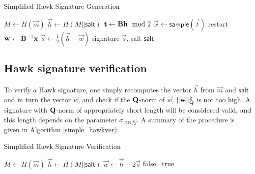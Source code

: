 \begin{algorithm}
    \caption{Simplified Hawk Signature Generation}\label{simple_hawksign}
\begin{algorithmic}[1]
    \State $M \gets H(\vec{m})$ 
    \State $\vec{h} \gets H(M || \mathsf{salt})$ 
    \State $\mathbf{t} \gets \mathbf{B} \mathbf{h} \mod 2$ 
    \State $\vec{x} \gets \mathsf{sample}(\vec{t})$
    \State restart
    \Else
    \State $\mathbf{w} \gets \mathbf{B}^{-1} \mathbf{x}$
    \State $\vec{s} \gets \frac{1}{2}(\vec{h} - \vec{w})$
    \State \Return signature $\vec{s}$, salt $\mathsf{salt}$
    \EndIf
\end{algorithmic}
\end{algorithm}


\subsection{Hawk signature verification}
To verify a Hawk signature, one simply recomputes the vector $\vec{h}$ from $\vec{m}$ and $\mathsf{salt}$ and in turn the vector $\vec{w}$, and check if the $\mathbf{Q}$-norm of $\vec{w}$,
$\lVert \mathbf{w} \rVert_{\mathbf{Q}}^2$ is not too high. A signature with $\mathbf{Q}$-norm of appropriately short length will be considered valid, and this length depends on the parameter $\sigma_{verify}$.
A summary of the procedure is given in Algorithm \ref{simple_hawkver}:

\begin{algorithm}[H]
    \caption{Simplified Hawk Signature Verification}\label{simple_hawkver}
\begin{algorithmic}[1]
    \State $M \gets H(\vec{m})$ 
    \State $\vec{h} \gets H(M || \mathsf{salt})$
    \State $\vec{w} \gets \vec{h} - 2\vec{s}$
    \State \Return false
    \Else \ \Return true
    \EndIf
\end{algorithmic}
\end{algorithm}

